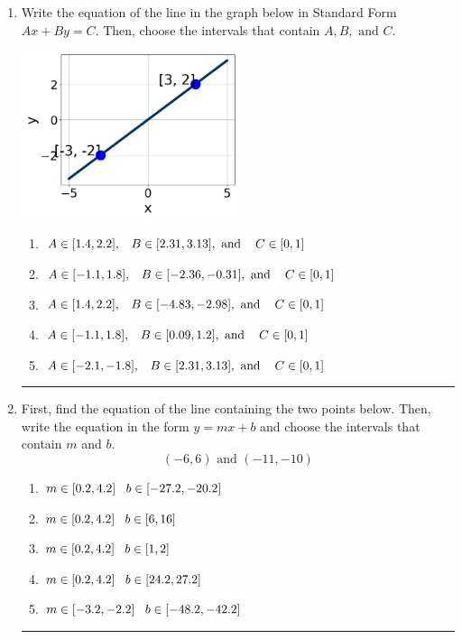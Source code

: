 \documentclass[14pt]{extbook}
\newcommand{\litem}[1]{\item#1\hspace*{-1cm}\rule{\textwidth}{0.4pt}}
\begin{document}
\begin{enumerate}
{\begin{enumerate}[label=\Alph*.]
\end{enumerate} }
\litem{
Write the equation of the line in the graph below in Standard Form $Ax+By=C$. Then, choose the intervals that contain $A, B, \text{ and } C$.
\begin{center}
    \includegraphics[width=0.5\textwidth]{../Figures/linearGraphToStandardCopyA.png}
\end{center}
\begin{enumerate}[label=\Alph*.]
\item \( A \in [1.4, 2.2], \hspace{3mm} B \in [2.31, 3.13], \text{ and } \hspace{3mm} C \in [0, 1] \)
\item \( A \in [-1.1, 1.8], \hspace{3mm} B \in [-2.36, -0.31], \text{ and } \hspace{3mm} C \in [0, 1] \)
\item \( A \in [1.4, 2.2], \hspace{3mm} B \in [-4.83, -2.98], \text{ and } \hspace{3mm} C \in [0, 1] \)
\item \( A \in [-1.1, 1.8], \hspace{3mm} B \in [0.09, 1.2], \text{ and } \hspace{3mm} C \in [0, 1] \)
\item \( A \in [-2.1, -1.8], \hspace{3mm} B \in [2.31, 3.13], \text{ and } \hspace{3mm} C \in [0, 1] \)

\end{enumerate} }
\litem{
First, find the equation of the line containing the two points below. Then, write the equation in the form $ y=mx+b $ and choose the intervals that contain $m$ and $b$.\[ (-6, 6) \text{ and } (-11, -10) \]\begin{enumerate}[label=\Alph*.]
\item \( m \in [0.2, 4.2] \hspace*{3mm} b \in [-27.2, -20.2] \)
\item \( m \in [0.2, 4.2] \hspace*{3mm} b \in [6, 16] \)
\item \( m \in [0.2, 4.2] \hspace*{3mm} b \in [1, 2] \)
\item \( m \in [0.2, 4.2] \hspace*{3mm} b \in [24.2, 27.2] \)
\item \( m \in [-3.2, -2.2] \hspace*{3mm} b \in [-48.2, -42.2] \)


\end{enumerate}}
\end{enumerate}
\end{document}

